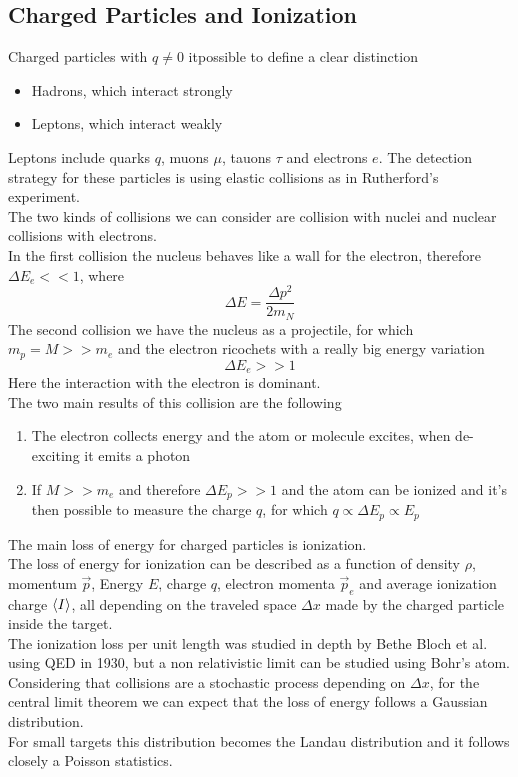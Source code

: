 \documentclass[../qm.tex]{subfiles}
\begin{document}
\subsection{Charged Particles and Ionization}
Charged particles with $q\ne0$ it\sigma possible to define a clear distinction
\begin{itemize}
\item Hadrons, which interact strongly
\item Leptons, which interact weakly
\end{itemize}
Leptons include quarks $q$, muons $\mu$, tauons $\tau$ and electrons $e$. The detection strategy for these particles is using elastic collisions as in Rutherford's experiment.\\
The two kinds of collisions we can consider are collision with nuclei and nuclear collisions with electrons.\\
In the first collision the nucleus behaves like a wall for the electron, therefore $\Delta E_e<<1$, where
\begin{equation*}
	\Delta E=\frac{\Delta p^2}{2m_N}
\end{equation*}
The second collision we have the nucleus as a projectile, for which $m_p=M>>m_e$ and the electron ricochets with a really big energy variation
\begin{equation*}
	\Delta E_e>>1
\end{equation*}
Here the interaction with the electron is dominant.\\
The two main results of this collision are the following
\begin{enumerate}
\item The electron collects energy and the atom or molecule excites, when de-exciting it emits a photon
\item If $M>>m_e$ and therefore $\Delta E_p>>1$ and the atom can be ionized and it's then possible to measure the charge $q$, for which $q\propto\Delta E_p\propto E_p$
\end{enumerate}
The main loss of energy for charged particles is ionization.\\
The loss of energy for ionization can be described as a function of density $\rho$, momentum $\vec{p}$, Energy $E$, charge $q$, electron momenta $\vec{p}_e$ and average ionization charge $\expval{I}$, all depending on the traveled space $\Delta x$ made by the charged particle inside the target.\\
The ionization loss per unit length was studied in depth by Bethe Bloch et al. using QED in 1930, but a non relativistic limit can be studied using Bohr's atom.\\
Considering that collisions are a stochastic process depending on $\Delta x$, for the central limit theorem we can expect that the loss of energy follows a Gaussian distribution.\\
For small targets this distribution becomes the Landau distribution and it follows closely a Poisson statistics.
\end{document}
